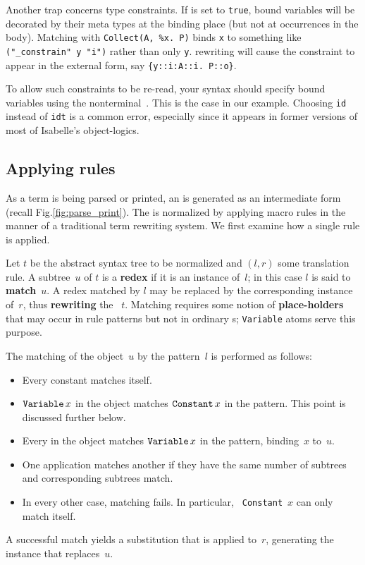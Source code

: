 \begin{warn}
Another trap concerns type constraints.  If  is set to
{\tt true}, bound variables will be decorated by their meta types at the
binding place (but not at occurrences in the body).  Matching with
\verb|Collect(A, %x. P)| binds {\tt x} to something like {\tt ("_constrain" y
"i")} rather than only {\tt y}.  \AST{} rewriting will cause the constraint to
appear in the external form, say \verb|{y::i:A::i. P::o}|.  

To allow such constraints to be re-read, your syntax should specify bound
variables using the nonterminal~.  This is the case in our
example.  Choosing {\tt id} instead of {\tt idt} is a common error,
especially since it appears in former versions of most of Isabelle's
object-logics.
\end{warn}



\subsection{Applying rules}
As a term is being parsed or printed, an \AST{} is generated as an
intermediate form (recall Fig.\ts\ref{fig:parse_print}).  The \AST{} is
normalized by applying macro rules in the manner of a traditional term
rewriting system.  We first examine how a single rule is applied.

Let $t$ be the abstract syntax tree to be normalized and $(l, r)$ some
translation rule.  A subtree~$u$ of $t$ is a {\bf redex} if it is an
instance of~$l$; in this case $l$ is said to {\bf match}~$u$.  A redex
matched by $l$ may be replaced by the corresponding instance of~$r$, thus
{\bf rewriting} the \AST~$t$.  Matching requires some notion of {\bf
  place-holders} that may occur in rule patterns but not in ordinary
\AST{}s; {\tt Variable} atoms serve this purpose.

The matching of the object~$u$ by the pattern~$l$ is performed as follows:
\begin{itemize}
  \item Every constant matches itself.

  \item $\mathop{\mbox{\tt Variable}}\nolimits x$ in the object matches $\mathop{\mbox{\tt Constant}}\nolimits x$ in the pattern.
    This point is discussed further below.

  \item Every \AST{} in the object matches $\mathop{\mbox{\tt Variable}}\nolimits x$ in the pattern,
    binding~$x$ to~$u$.

  \item One application matches another if they have the same number of
    subtrees and corresponding subtrees match.

  \item In every other case, matching fails.  In particular, {\tt
      Constant}~$x$ can only match itself.
\end{itemize}
A successful match yields a substitution that is applied to~$r$, generating
the instance that replaces~$u$.


